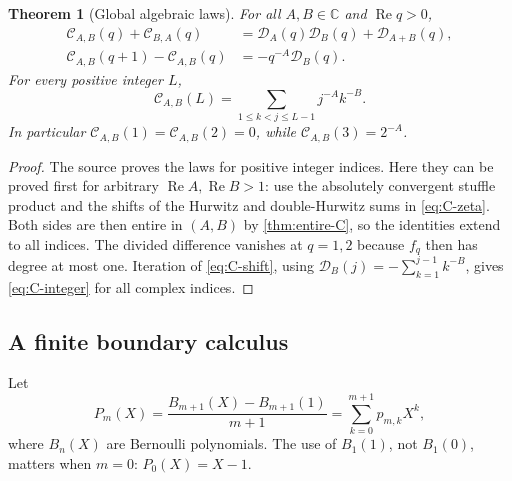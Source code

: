 \documentclass[11pt]{article}
\numberwithin{equation}{section}
\newtheorem{theorem}{Theorem}[section]
\theoremstyle{definition}
\DeclareMathOperator{\Rea}{Re}
\newcommand{\C}{\mathbb C}
\newcommand{\CC}{\mathcal C}
\newcommand{\DD}{\mathcal D}
\begin{document}
\begin{theorem}[Global algebraic laws]\label{thm:C-laws}
For all $A,B\in\C$ and $\Rea q>0$,
\begin{align}
 \CC_{A,B}(q)+\CC_{B,A}(q)
 &=\DD_A(q)\DD_B(q)+\DD_{A+B}(q),\label{eq:C-stuffle}\\
 \CC_{A,B}(q+1)-\CC_{A,B}(q)
 &=-q^{-A}\DD_B(q).\label{eq:C-shift}
\end{align}
For every positive integer $L$,
\begin{equation}\label{eq:C-integer}
 \CC_{A,B}(L)=\sum_{1\le k<j\le L-1}j^{-A}k^{-B}.
\end{equation}
In particular $\CC_{A,B}(1)=\CC_{A,B}(2)=0$, while $\CC_{A,B}(3)=2^{-A}$.
\end{theorem}
\begin{proof}
The source proves the laws for positive integer indices. Here they can be proved first for arbitrary $\Rea A,\Rea B>1$: use the absolutely convergent stuffle product and the shifts of the Hurwitz and double-Hurwitz sums in \eqref{eq:C-zeta}. Both sides are then entire in $(A,B)$ by \cref{thm:entire-C}, so the identities extend to all indices. The divided difference vanishes at $q=1,2$ because $f_q$ then has degree at most one. Iteration of \eqref{eq:C-shift}, using $\DD_B(j)=-\sum_{k=1}^{j-1}k^{-B}$, gives \eqref{eq:C-integer} for all complex indices.
\end{proof}

\subsection{A finite boundary calculus}
Let
\begin{equation}\label{eq:Faulhaber}
 P_m(X)=\frac{B_{m+1}(X)-B_{m+1}(1)}{m+1}
       =\sum_{k=0}^{m+1}p_{m,k}X^k,
\end{equation}
where $B_n(X)$ are Bernoulli polynomials. The use of $B_1(1)$, not $B_1(0)$, matters when $m=0$: $P_0(X)=X-1$.
\end{document}
